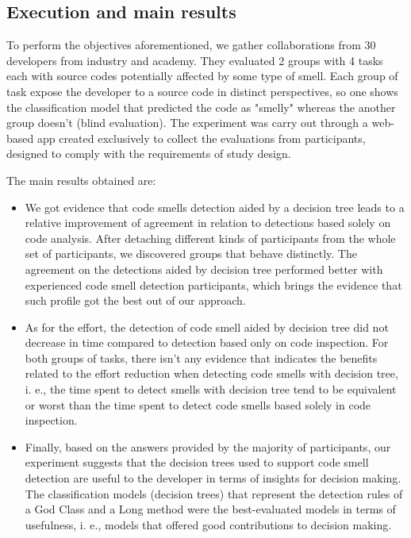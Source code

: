 \subsection{Execution and main results}

To perform  the objectives aforementioned,  we gather collaborations from 30  developers from industry and academy. They evaluated 2 groups with 4 tasks each with source codes potentially affected by some type of smell. Each group of task expose the developer to a source code in distinct perspectives, so one shows the classification model that predicted the code as "smelly" whereas the another group doesn't (blind evaluation).  The experiment was carry out through a web-based app created exclusively to collect the evaluations from participants, designed to comply with the requirements of study design.

The main results obtained are:

\begin{itemize}
    \item We got evidence that code smells detection aided by a decision tree leads to a  relative improvement of agreement in relation to detections based solely on code analysis. After detaching different kinds of participants from the whole set of participants, we discovered groups that behave distinctly. The agreement on the detections aided by decision tree performed better with experienced code smell detection participants, which brings the evidence that such profile got the best out of our approach.

    \item As for the effort, the detection of code smell aided by decision tree did not decrease in time compared to detection based only on code inspection. For both groups of tasks, there isn’t any evidence that indicates the benefits related to the effort reduction when detecting code smells with decision tree, i. e., the time spent to detect smells with decision tree tend to be equivalent or worst than the time spent to detect code smells based solely in code inspection. 
    
    \item Finally, based on the answers provided by the majority of participants, our experiment suggests that the decision trees used to support code smell detection are useful to the developer in terms of insights for decision making. The classification models (decision trees) that represent the detection rules of a God Class and a Long method were the best-evaluated models in terms of usefulness, i. e., models that offered good contributions to decision making.
\end{itemize}



